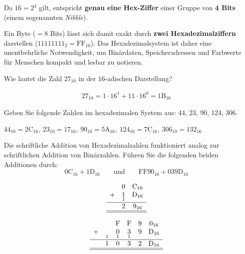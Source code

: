\begin{myremark}
Da $16 = 2^4$ gilt, entspricht \textbf{genau eine Hex-Ziffer} einer Gruppe von \textbf{4 Bits} (einem sogenannten \textit{Nibble}). 

Ein Byte ($= 8$ Bits) lässt sich damit exakt durch \textbf{zwei Hexadezimalziffern} darstellen ($11111111_2 = \text{FF}_{16}$). Das Hexadezimalsystem ist daher eine unentbehrliche Notwendigkeit, um Binärdaten, Speicheradressen und Farbwerte für Menschen kompakt und lesbar zu notieren.
\end{myremark}

\begin{myexercise}
	Wie lautet die Zahl $27_{10}$ in der $16$-adischen Darstellung?
	\begin{myanswer}
		\begin{align*}
			27_{10} = 1\cdot 16^1 + 11\cdot 16^0 = 1\text{B}_{16}
		\end{align*}
	\end{myanswer}
\end{myexercise}

\begin{myexercise}
	Geben Sie folgende Zahlen im hexadezimalen System aus: 44, 23, 90, 124, 306.
	\begin{myanswer}
		$44_{10} = 2\text{C}_{16},\ 23_{10} = 17_{16},\ 90_{10} = 5\text{A}_{16},\ 124_{10} = 7\text{C}_{16},\ 306_{10} = 132_{16}$
	\end{myanswer}
\end{myexercise}

\begin{mychallenge}
	\label{challenge:hexAddition}
	Die schriftliche Addition von Hexadezimalzahlen funktioniert analog zur schriftlichen Addition von Binärzahlen. Führen Sie die folgenden beiden Additionen durch:
	$$ 0\text{C}_{16} + 1\text{D}_{16} \qquad \text{und} \qquad \text{FF}90_{16} + 039\text{D}_{16}$$
	\begin{myanswer}
		\[
			\begin{array}{ccc}
				  & 0               & \text{C}_{16}              \\
				+ & \underset{1}{1} & \underset{}{\text{D}_{16}} \\
				\hline
				  & 2               & 9_{16}                     \\
				\hline\hline
			\end{array}
		\]

		\[
			\begin{array}{cccccc}
				  &                & \text{F}        & \text{F}        & 9              & 0_{16}                     \\
				+ & \underset{1}{} & \underset{1}{0} & \underset{1}{3} & \underset{}{9} & \underset{}{\text{D}_{16}} \\
				\hline
				  & 1              & 0               & 3               & 2              & \text{D}_{16}              \\
				\hline\hline
			\end{array}
		\]
	\end{myanswer}
\end{mychallenge}

